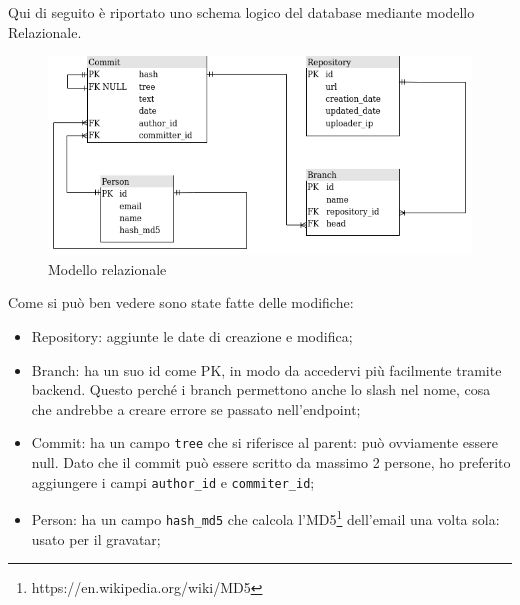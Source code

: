 Qui di seguito è riportato uno schema logico del database mediante modello Relazionale.
\begin{figure}[htp]
\centering
\includegraphics[scale=0.70]{data/relation.png}
\caption{Modello relazionale}
\label{}
\end{figure}

Come si può ben vedere sono state fatte delle modifiche:
\begin{itemize}
\item Repository: aggiunte le date di creazione e modifica;
\item Branch: ha un suo id come PK, in modo da accedervi più facilmente tramite backend. Questo perché i branch permettono anche lo slash nel nome, cosa che andrebbe a creare errore se passato nell'endpoint;
\item Commit: ha un campo \verb|tree| che si riferisce al parent: può ovviamente essere null. Dato che il commit può essere scritto da massimo 2 persone, ho preferito aggiungere i campi \verb|author_id| e \verb|commiter_id|;
\item Person: ha un campo \verb|hash_md5| che calcola l'MD5\footnote{https://en.wikipedia.org/wiki/MD5} dell'email una volta sola: usato per il gravatar;
\end{itemize}
